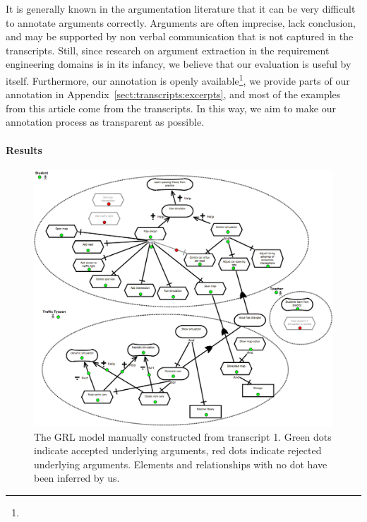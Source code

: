 It is generally known in the argumentation literature that it can be very difficult to annotate arguments correctly. Arguments are often imprecise, lack conclusion, and may be supported by non verbal communication that is not captured in the transcripts. Still, since research on argument extraction in the requirement engineering domains is in its infancy, we believe that our evaluation is useful by itself. Furthermore, our annotation is openly available\footnote{}, we provide parts of our annotation in Appendix~\ref{sect:transcripts:excerpts}, and most of the examples from this article come from the transcripts. In this way, we aim to make our annotation process as transparent as possible.

\paragraph{Results}

\begin{figure}[h]
\includegraphics[width=\textwidth]{img/transcript_grl}
\caption{The GRL model manually constructed from transcript 1. Green dots indicate accepted underlying arguments, red dots indicate rejected underlying arguments. Elements and relationships with no dot have been inferred by us.}
\label{fig:transcripts:grl}
\end{figure}


